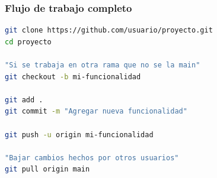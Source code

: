 \documentclass[aspectratio=169]{beamer}
\begin{document}
\begin{frame}[fragile]
\frametitle{Flujo de trabajo completo}
\begin{lstlisting}[language=bash]
git clone https://github.com/usuario/proyecto.git
cd proyecto

"Si se trabaja en otra rama que no se la main"
git checkout -b mi-funcionalidad

git add .
git commit -m "Agregar nueva funcionalidad"

git push -u origin mi-funcionalidad

"Bajar cambios hechos por otros usuarios"
git pull origin main
\end{lstlisting}
\end{frame}

%
%
%
%
%

\end{document}
